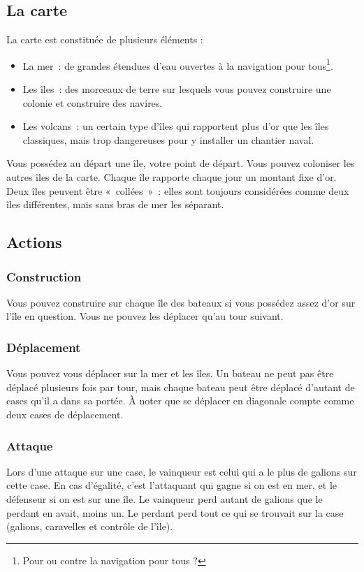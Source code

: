 \subsection{La carte}
La carte est constituée de plusieurs éléments :
\begin{itemize}
	\item La mer~: de grandes étendues d'eau ouvertes à la navigation pour tous\footnote{Pour ou contre la navigation pour tous ?}.
	\item Les îles~: des morceaux de terre sur lesquels vous pouvez construire une
		colonie et construire des navires.
	\item Les volcans~: un certain type d'îles qui rapportent plus d'or que les îles classiques, mais
		trop dangereuses pour y installer un chantier naval.
\end{itemize}

Vous possédez au départ une île, votre point de départ. Vous pouvez coloniser
les autres îles de la carte.
Chaque île rapporte chaque jour un montant fixe d'or.
Deux îles peuvent être «~collées~»~: elles sont toujours considérées comme deux
îles différentes, mais sans bras de mer les séparant.

\subsection{Actions}

\subsubsection{Construction}
Vous pouvez construire sur chaque île des bateaux si vous possédez assez d'or
sur l'île en question. Vous ne pouvez les déplacer qu'au tour suivant.

\subsubsection{Déplacement}
Vous pouvez vous déplacer sur la mer et les îles. Un bateau ne peut
pas être déplacé plusieurs fois par tour, mais chaque bateau peut être déplacé d'autant de
cases qu'il a dans sa portée. À noter que se déplacer en diagonale compte comme deux cases de déplacement.

\subsubsection{Attaque}
Lors d'une attaque sur une case, le vainqueur est celui qui a le plus de galions sur cette case. En cas d'égalité, c'est
l'attaquant qui gagne si on est en mer, et le défenseur si on est sur une
île. Le vainqueur perd autant de galions que le perdant en avait, moins
un. Le perdant perd tout ce qui se trouvait sur la case (galions, caravelles et contrôle de l'île).

